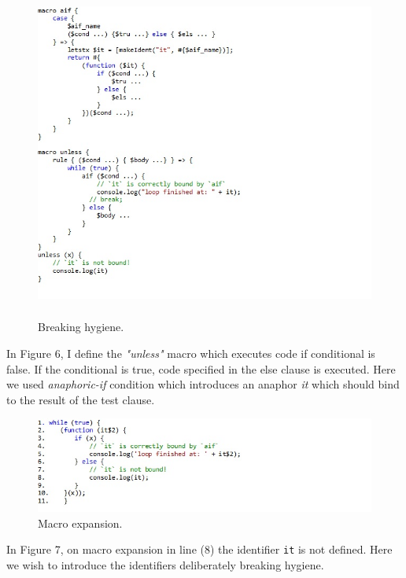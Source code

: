 \begin{figure}
\centering
\includegraphics[width=1.0\textwidth,height=11cm]{images/Breakhygiene.jpg}
\caption{Breaking hygiene.} 
\label{fig:Breakhygiene}

\end{figure}
\newpage
In Figure 6, I define the \textit{"unless"} macro which executes code if conditional is false. If the conditional is true, code specified in the else clause is executed. Here we used \textit{anaphoric-if} condition which introduces an anaphor \textit{it} which should bind to the result of the test clause.

\begin{figure}

\centering
\includegraphics[width=1.0\textwidth]{images/macroexpansion.jpg}
\caption{Macro expansion.} 
\label{fig:macroexpansion}

\end{figure}

In Figure 7, on macro expansion in line (8) the identifier \texttt{it} is not defined. Here we wish to introduce the identifiers deliberately breaking hygiene. 

